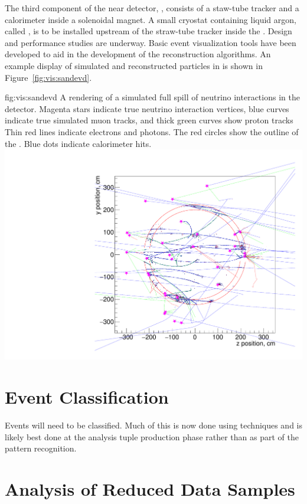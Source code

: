 \documentclass[../main-v1.tex]{subfiles}
\begin{document}
The third component of the near detector, , consists of a staw-tube tracker and a calorimeter inside a solenoidal magnet.  A small cryostat containing liquid argon, called , %
is to be installed upstream of the straw-tube tracker inside the .  Design and performance studies are underway.  Basic event visualization tools have been developed to aid in the development of the reconstruction algorithms.  An example display of simulated and reconstructed particles in  is shown in Figure~\ref{fig:vis:sandevd}.

\begin{dunefigure}
{fig:vis:sandevd} 
{A rendering of a simulated full spill of neutrino interactions in the  detector. Magenta stars indicate true neutrino interaction vertices, blue curves indicate true simulated muon tracks, and thick green curves show proton tracks  Thin red lines indicate electrons and photons.  The red circles show the outline of the .  Blue dots indicate calorimeter hits.}
\includegraphics[width=0.9 \textwidth]{graphics/EventDisplays/sand_detector_view_stt_17924.pdf}
\end{dunefigure}

\section{Event Classification}
Events will need to be classified.  Much of this is now done using  techniques and is likely best done at the analysis tuple production phase rather than as part of the pattern recognition. 


\section{Analysis of Reduced Data Samples}
\end{document}
